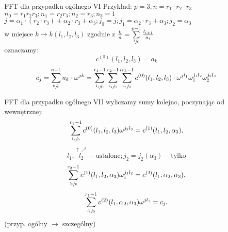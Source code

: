 \begin{frame}{FFT dla przypadku ogólnego VI}
	Przykład: $p = 3, n = r_1 \cdot r_2 \cdot r_3$ \\
	$n_0 = r_1r_2r_3 ; n_1 = r_2r_3 ; n_2 = r_3 ; n_3 = 1$ \\
	$j = \alpha_1 \cdot (r_2 \cdot r_3) + \alpha_2 \cdot r_3 + \alpha_3 ; j_0 = j ; j_1 = \alpha_2  \cdot r_3 + \alpha_3 ; j_2 = \alpha_3$ \\
	w miejsce $k \to k(l_1, l_2, l_3)$ zgodnie z $\frac{k}{n} = \sum\limits_{\sfrac{i}{0}}^{p-1} \frac{l_{i+1}}{n_i}$ \\
	oznaczamy:
	\[
		c^{(0)}(l_1, l_2, l_3) = a_k
	\]
	\[
		c_j = \sum\limits_{\sfrac{k}{0}}^{n-1} a_k \cdot \omega^{jk} = \sum\limits_{\sfrac{l_1}{0}}^{r_1 - 1} \sum\limits_{\sfrac{l_2}{0}}^{r_2 - 1} \sum\limits_{\sfrac{l_3}{0}}^{lr_3 - 1} c^{(0)}(l_1, l_2, l_3) \cdot \omega^{jl_1} \omega_1^{j_1l_2} \omega_2^{j_2l_3}
	\]
\end{frame}
\begin{frame}{FFT dla przypadku ogólnego VII}
	wyliczamy sumy kolejno, poczynając od wewnętrznej:
	\[
		\sum\limits_{\sfrac{l_3}{0}}^{r_3 - 1} c^{(0)}(l_1, l_2, l_3) \omega^{j_2l_3} = c^{(1)}(l_1, l_2,\alpha_3),
	\]
	\[
		l_1, \stackrel{\uparrow\nearrow}{l_2} - \text{ustalone} ; j_2 = j_2(\alpha_3) - \text{tylko}
	\]
	\[
		\sum\limits_{\sfrac{l_2}{0}}^{r_2 - 1} c^{(1)}(l_1, l_2, \alpha_3)\omega_1^{j_1l_2} = c^{(2)}(l_1,\alpha_2,\alpha_3),
	\] 
	\[
		\sum\limits_{\sfrac{l_1}{0}}^{r_1 - 1} c^{(2)}(l_1, \alpha_2, \alpha_3) \omega^{jl_1} = c_j.
	\]
	(przyp. ogólny $\to$ szczególny)
\end{frame}